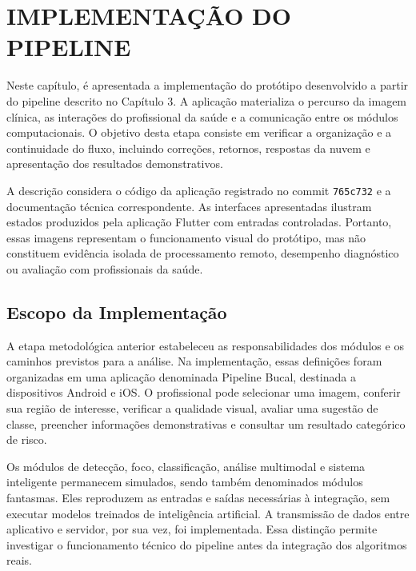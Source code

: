 \providecommand{\pipelinefigdir}{capitulo-implementacao/figuras}
\chapter{IMPLEMENTAÇÃO DO PIPELINE}
\label{cap:implementacao-pipeline}
Neste capítulo, é apresentada a implementação do protótipo desenvolvido a partir do pipeline descrito no Capítulo 3. A aplicação materializa o percurso da imagem clínica, as interações do profissional da saúde e a comunicação entre os módulos computacionais. O objetivo desta etapa consiste em verificar a organização e a continuidade do fluxo, incluindo correções, retornos, respostas da nuvem e apresentação dos resultados demonstrativos.

A descrição considera o código da aplicação registrado no commit \texttt{765c732} e a documentação técnica correspondente. As interfaces apresentadas ilustram estados produzidos pela aplicação Flutter com entradas controladas. Portanto, essas imagens representam o funcionamento visual do protótipo, mas não constituem evidência isolada de processamento remoto, desempenho diagnóstico ou avaliação com profissionais da saúde.

\section{Escopo da Implementação}
A etapa metodológica anterior estabeleceu as responsabilidades dos módulos e os caminhos previstos para a análise. Na implementação, essas definições foram organizadas em uma aplicação denominada Pipeline Bucal, destinada a dispositivos Android e iOS. O profissional pode selecionar uma imagem, conferir sua região de interesse, verificar a qualidade visual, avaliar uma sugestão de classe, preencher informações demonstrativas e consultar um resultado categórico de risco.

Os módulos de detecção, foco, classificação, análise multimodal e sistema inteligente permanecem simulados, sendo também denominados módulos fantasmas. Eles reproduzem as entradas e saídas necessárias à integração, sem executar modelos treinados de inteligência artificial. A transmissão de dados entre aplicativo e servidor, por sua vez, foi implementada. Essa distinção permite investigar o funcionamento técnico do pipeline antes da integração dos algoritmos reais.

